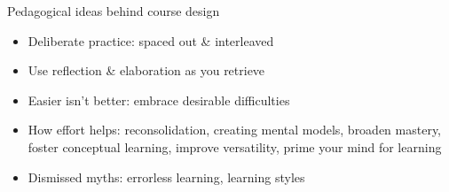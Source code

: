 \documentclass[aspectratio=169]{beamer}
\newcommand{\EndSlide}{\begin{frame}[plain]\endpage\end{frame}}
\newenvironment{Slide}[1]%
  {\begin{frame}[environment=Slide]{#1}}
  {\end{frame}}%
\begin{document}
\begin{Slide}{Pedagogical ideas behind course design}
\begin{minipage}{0.7\textwidth}
\begin{itemize}
        \item Deliberate practice: spaced out \& interleaved
        \item Use reflection \& elaboration as you retrieve
        \item Easier isn't better: embrace desirable difficulties
        \item How effort helps: reconsolidation, creating mental models, broaden mastery, foster conceptual learning, improve versatility, prime your mind for learning 
        \item Dismissed myths: errorless learning, learning styles
      \end{itemize}
    \end{minipage}
    \end{Slide}
  
\EndSlide
\end{document}
